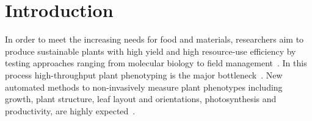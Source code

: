\section{Introduction}
\label{sec:intro}

In order to meet the increasing needs for food and materials, researchers aim to produce sustainable plants with high yield and high resource-use efficiency by testing approaches ranging from molecular biology to field management~\cite{walter2015plant1}. In this process high-throughput plant phenotyping is the major bottleneck~\cite{cobb2013next}. New automated methods to non-invasively measure plant phenotypes including growth, plant structure, leaf layout and orientations, photosynthesis and productivity, are highly expected~\cite{leister1999large,muller2015leaf,walter2015plant1}. 


